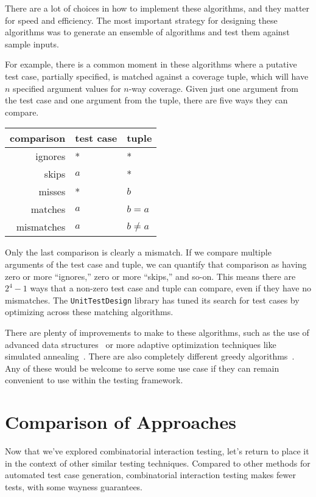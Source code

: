\documentclass{juliacon}
\newcommand{\utd}{\texttt{UnitTestDesign}\xspace}
\begin{document}
\vskip 6pt
There are a lot of choices in how to implement these algorithms, and they matter for speed and efficiency. The most important strategy for designing these algorithms was to generate an ensemble of algorithms and test them against sample inputs.

\vskip 6pt
For example, there is a common moment in these algorithms where a putative test case, partially specified, is matched against a coverage tuple, which will have $n$ specified argument values for $n$-way coverage. Given just one argument from the test case and one argument from the tuple, there are five ways they can compare.
\begin{center}
\begin{tabular}{rll}
comparison & test case & tuple \\ \hline
ignores & * & * \\
skips & $a$ & * \\
misses & * & $b$ \\
matches & $a$ & $b=a$ \\
mismatches & $a$ & $b\ne a$
\end{tabular}
\end{center}
Only the last comparison is clearly a mismatch. If we compare multiple arguments of the test case and tuple, we can quantify that comparison as having zero or more ``ignores,'' zero or more ``skips,'' and so-on. This means there are $2^4-1$ ways that a non-zero test case and tuple can compare, even if they have no mismatches. The \utd library has tuned its search for test cases by optimizing across these matching algorithms.

\vskip 6pt
There are plenty of improvements to make to these algorithms, such as the use of advanced data structures~\cite{Segall2011-jv} or more adaptive optimization techniques like simulated annealing~\cite{Petke2015-ex}. There are also completely different greedy algorithms~\cite{Calvagna2012-ic,Koc2018-vs}. Any of these would be welcome to serve some use case if they can remain convenient to use within the testing framework.


\section{Comparison of Approaches}\label{sec:comparison}

Now that we've explored combinatorial interaction testing, let's return to place it in the context of other similar testing techniques. Compared to other methods for automated test case generation, combinatorial interaction testing makes fewer tests, with some wayness guarantees.
\end{document}
